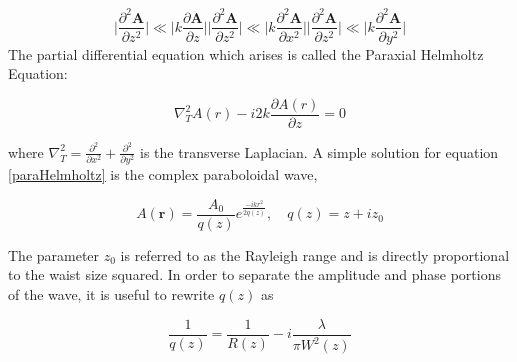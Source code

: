 		\begin{subequations}
		\begin{equation}\label{paraxiala}
		\bigg| { \frac{\partial^2 \mathbf{A}}{\partial z^2} } \bigg|  \ll  \bigg| { k {\frac{\partial\mathbf{A}}{{\partial z}} } } \bigg|
		\end{equation}
		\begin{equation}\label{paraxialb}
		\bigg| { \frac{\partial^2 \mathbf{A}}{\partial z^2} } \bigg|  \ll  \bigg| { k {\frac{\partial^2 \mathbf{A}}{\partial x^2}} } \bigg|
		\end{equation}
		\begin{equation}\label{paraxialc}
		\bigg| { \frac{\partial^2 \mathbf{A}}{\partial z^2} } \bigg|  \ll  \bigg| { k{\frac{\partial^2 \mathbf{A}}{\partial y^2}}} \bigg|
		\end{equation}
		\end{subequations}
		The partial differential equation which arises is called the Paraxial Helmholtz Equation:
		
		\begin{equation}\label{paraHelmholtz}
		\nabla_T^2 A(r) - i2k \frac{\partial A(r)}{\partial z} = 0
		\end{equation}
		
		where $\nabla_T^2 = \frac{\partial^2}{\partial x^2} + \frac{\partial^2}{\partial y^2} $ is the transverse Laplacian.  A simple solution for equation \ref{paraHelmholtz} is the complex paraboloidal wave,
		
		\begin{equation} \label{complexenvelope}
		A(\mathbf{r}) = \frac{A_0}{q(z)} e^{\frac{-ikr^2}{2q(z)}} , \quad q(z)=z+iz_0
		\end{equation}
		
		The parameter $z_0$ is referred to as the Rayleigh range and is directly proportional to the waist size squared.  In order to separate the amplitude and phase portions of the wave, it is useful to rewrite $q(z)$ as
		
		\begin{equation}\label{invq}
		\frac{1}{q(z)} = \frac{1}{R(z)} - i \frac{\lambda}{\pi W^2(z)}
		\end{equation} 
		
